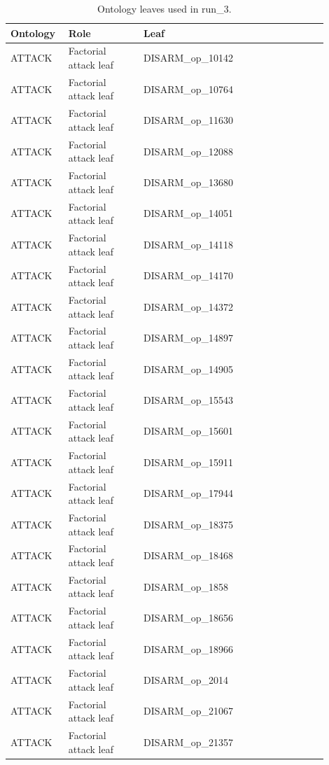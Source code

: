 \begin{table}[htbp]
\centering
\begin{threeparttable}
\caption{Ontology leaves used in run\_3.}
\label{tab:ontologies}
\small
\setlength{\tabcolsep}{4.5pt}
\renewcommand{\arraystretch}{1.10}
\begin{tabular}{p{0.14\linewidth}p{0.22\linewidth}p{0.54\linewidth}}
\toprule
Ontology & Role & Leaf \\
\midrule
ATTACK & Factorial attack leaf & DISARM\_op\_10142 \\
ATTACK & Factorial attack leaf & DISARM\_op\_10764 \\
ATTACK & Factorial attack leaf & DISARM\_op\_11630 \\
ATTACK & Factorial attack leaf & DISARM\_op\_12088 \\
ATTACK & Factorial attack leaf & DISARM\_op\_13680 \\
ATTACK & Factorial attack leaf & DISARM\_op\_14051 \\
ATTACK & Factorial attack leaf & DISARM\_op\_14118 \\
ATTACK & Factorial attack leaf & DISARM\_op\_14170 \\
ATTACK & Factorial attack leaf & DISARM\_op\_14372 \\
ATTACK & Factorial attack leaf & DISARM\_op\_14897 \\
ATTACK & Factorial attack leaf & DISARM\_op\_14905 \\
ATTACK & Factorial attack leaf & DISARM\_op\_15543 \\
ATTACK & Factorial attack leaf & DISARM\_op\_15601 \\
ATTACK & Factorial attack leaf & DISARM\_op\_15911 \\
ATTACK & Factorial attack leaf & DISARM\_op\_17944 \\
ATTACK & Factorial attack leaf & DISARM\_op\_18375 \\
ATTACK & Factorial attack leaf & DISARM\_op\_18468 \\
ATTACK & Factorial attack leaf & DISARM\_op\_1858 \\
ATTACK & Factorial attack leaf & DISARM\_op\_18656 \\
ATTACK & Factorial attack leaf & DISARM\_op\_18966 \\
ATTACK & Factorial attack leaf & DISARM\_op\_2014 \\
ATTACK & Factorial attack leaf & DISARM\_op\_21067 \\
ATTACK & Factorial attack leaf & DISARM\_op\_21357 \\

\end{tabular}
\end{threeparttable}
\end{table}
